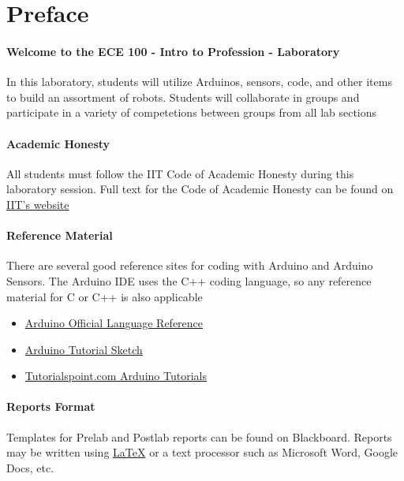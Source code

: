 \section{Preface}

\paragraph{Welcome to the ECE 100 - Intro to Profession - Laboratory}{
In this laboratory, students will utilize Arduinos, sensors, code, and other items to build an assortment of robots. Students will collaborate in groups and participate in a variety of competetions between groups from all lab sections}

\paragraph{Academic Honesty}{
All students must follow the IIT Code of Academic Honesty during this laboratory session. Full text for the Code of Academic Honesty can be found on \href{https://www.iit.edu/student-affairs/student-handbook/fine-print/code-academic-honesty}{IIT's website}}

\paragraph{Reference Material}{
There are several good reference sites for coding with Arduino and Arduino Sensors. The Arduino IDE uses the C++ coding language, so any reference material for C or C++ is also applicable
\begin{itemize}
	\item \href{https://www.arduino.cc/reference/en/}{Arduino Official Language Reference}
	\item \href{https://www.arduino.cc/en/tutorial/sketch}{Arduino Tutorial Sketch}
	\item \href{https://www.tutorialspoint.com/arduino/index.htm}{Tutorialspoint.com Arduino Tutorials}
\end{itemize}
}

\paragraph{Reports Format}{ Templates for Prelab and Postlab reports can be found on Blackboard. Reports may be written using \href{https://www.latex-project.org/}{LaTeX} or a text processor such as Microsoft Word, Google Docs, etc.
}